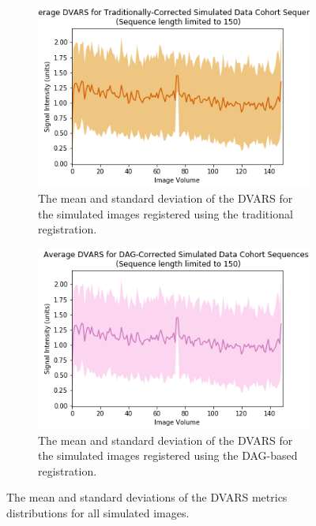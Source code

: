 \begin{figure}[t]
	\begin{subfigure}{0.45\textwidth}
		\centering
		\includegraphics[width=1\textwidth]{6/figures/spectr-trad-dvars-150.png}
		\caption{The mean and standard deviation of the DVARS for the simulated images registered using the traditional registration.}
	\end{subfigure}%
	\vspace{0.1\textwidth}
	\begin{subfigure}{0.45\textwidth}
		\centering
		\includegraphics[width=1\textwidth]{6/figures/spectr-dag-dvars-150.png}
		\caption{The mean and standard deviation of the DVARS for the simulated images registered using the DAG-based registration.}
	\end{subfigure}
\caption{The mean and standard deviations of the DVARS metrics distributions for all simulated images.}
\label{fig:spectr-dvars-150}
\end{figure}


